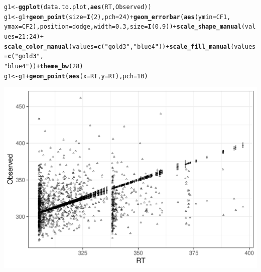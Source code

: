 \documentclass{article}\usepackage[]{graphicx}\usepackage[]{color}
\makeatletter
\def\maxwidth{ %
  \ifdim\Gin@nat@width>\linewidth
    \linewidth
  \else
    \Gin@nat@width
  \fi
}
\newcommand{\hlnum}[1]{\textcolor[rgb]{0.686,0.059,0.569}{#1}}%
\newcommand{\hlstr}[1]{\textcolor[rgb]{0.192,0.494,0.8}{#1}}%
\newcommand{\hlopt}[1]{\textcolor[rgb]{0,0,0}{#1}}%
\newcommand{\hlstd}[1]{\textcolor[rgb]{0.345,0.345,0.345}{#1}}%
\newcommand{\hlkwb}[1]{\textcolor[rgb]{0.69,0.353,0.396}{#1}}%
\newcommand{\hlkwc}[1]{\textcolor[rgb]{0.333,0.667,0.333}{#1}}%
\newcommand{\hlkwd}[1]{\textcolor[rgb]{0.737,0.353,0.396}{\textbf{#1}}}%
\newenvironment{kframe}{%
 \def\at@end@of@kframe{}%
 \ifinner\ifhmode%
  \def\at@end@of@kframe{\end{minipage}}%
  \begin{minipage}{\columnwidth}%
 \fi\fi%
 \def\FrameCommand##1{\hskip\@totalleftmargin \hskip-\fboxsep
 \colorbox{shadecolor}{##1}\hskip-\fboxsep
     \hskip-\linewidth \hskip-\@totalleftmargin \hskip\columnwidth}%
 \MakeFramed {\advance\hsize-\width
   \@totalleftmargin\z@ \linewidth\hsize
   \@setminipage}}%
 {\par\unskip\endMakeFramed%
 \at@end@of@kframe}
\newenvironment{knitrout}{}{} %
\makeatother
\begin{document}
\begin{knitrout}
\color{fgcolor}\begin{kframe}
\begin{alltt}
\hlstd{g1} \hlkwb{<-} \hlkwd{ggplot}\hlstd{(data.to.plot,} \hlkwd{aes}\hlstd{(RT, Observed))}
\hlstd{g1} \hlkwb{<-} \hlstd{g1} \hlopt{+} \hlkwd{geom_point}\hlstd{(}\hlkwc{size} \hlstd{=} \hlkwd{I}\hlstd{(}\hlnum{2}\hlstd{),} \hlkwc{pch} \hlstd{=} \hlnum{24}\hlstd{)} \hlopt{+} \hlkwd{geom_errorbar}\hlstd{(}\hlkwd{aes}\hlstd{(}\hlkwc{ymin} \hlstd{= CF1,}
    \hlkwc{ymax} \hlstd{= CF2),} \hlkwc{position} \hlstd{= dodge,} \hlkwc{width} \hlstd{=} \hlnum{0.3}\hlstd{,} \hlkwc{size} \hlstd{=} \hlkwd{I}\hlstd{(}\hlnum{0.9}\hlstd{))} \hlopt{+} \hlkwd{scale_shape_manual}\hlstd{(}\hlkwc{values} \hlstd{=} \hlnum{21}\hlopt{:}\hlnum{24}\hlstd{)} \hlopt{+}
    \hlkwd{scale_color_manual}\hlstd{(}\hlkwc{values} \hlstd{=} \hlkwd{c}\hlstd{(}\hlstr{"gold3"}\hlstd{,} \hlstr{"blue4"}\hlstd{))} \hlopt{+} \hlkwd{scale_fill_manual}\hlstd{(}\hlkwc{values} \hlstd{=} \hlkwd{c}\hlstd{(}\hlstr{"gold3"}\hlstd{,}
    \hlstr{"blue4"}\hlstd{))} \hlopt{+} \hlkwd{theme_bw}\hlstd{(}\hlnum{28}\hlstd{)}
\hlstd{g1} \hlkwb{<-} \hlstd{g1} \hlopt{+} \hlkwd{geom_point}\hlstd{(}\hlkwd{aes}\hlstd{(}\hlkwc{x} \hlstd{= RT,} \hlkwc{y} \hlstd{= RT),} \hlkwc{pch} \hlstd{=} \hlnum{10}\hlstd{)}
\end{alltt}
\end{kframe}
\end{knitrout}

\begin{knitrout}
\color{fgcolor}\begin{kframe}


{\ttfamily\noindent\color{warningcolor}{\#\# Warning: position\_dodge requires non-overlapping x intervals}}\end{kframe}
\includegraphics[width=\maxwidth]{figures/figure_ns_unnamed-chunk-24-1} 

\end{knitrout}
\end{document}
